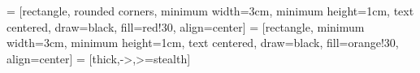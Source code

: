 \usepackage{tikz}
\usetikzlibrary{shapes.geometric, arrows, positioning} %

 = [rectangle, rounded corners, minimum width=3cm, minimum height=1cm, text centered, draw=black, fill=red!30, align=center]
 = [rectangle, minimum width=3cm, minimum height=1cm, text centered, draw=black, fill=orange!30, align=center]
 = [thick,->,>=stealth]